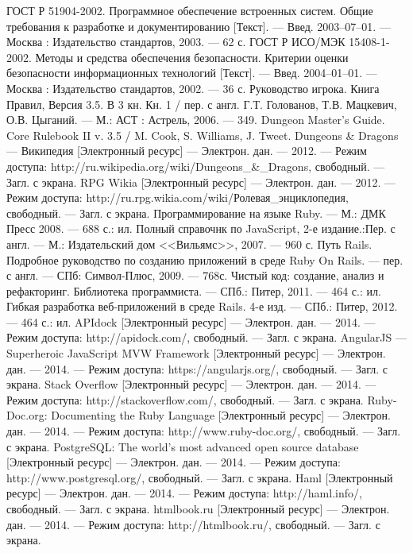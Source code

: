 \begin{thebibliography}{@@@@}
   ГОСТ Р 51904-2002. Программное обеспечение встроенных систем. Общие требования к разработке и документированию [Текст]. --- Введ. 2003–07–01. --- Москва : Издательство стандартов, 2003. --- 62 с. 
   ГОСТ Р ИСО/МЭК 15408-1-2002. Методы и средства обеспечения безопасности. Критерии оценки безопасности информационных технологий [Текст]. --- Введ. 2004–01–01. --- Москва : Издательство стандартов, 2002. --- 36 с.
   Руководство игрока. Книга Правил, Версия 3.5. В 3 кн. Кн. 1 / пер. с англ. Г.Т. Голованов, Т.В. Мацкевич, О.В. Цыганий. — М.: АСТ : Астрель, 2006. — 349.
   Dungeon Master's Guide. Core Rulebook II v. 3.5 / M. Cook, S. Williams, J. Tweet.
   Dungeons \& Dragons — Википедия [Электронный ресурс] --- Электрон. дан. --- 2012. --- Режим доступа: http://ru.wikipedia.org/wiki/Dungeons\_\&\_Dragons, свободный. --- Загл. с экрана.
   RPG Wikia [Электронный ресурс] --- Электрон. дан. --- 2012. --- Режим доступа: http://ru.rpg.wikia.com/wiki/Ролевая\_энциклопедия, свободный. --- Загл. с экрана.
   Программирование на языке Ruby. --- М.: ДМК Пресс 2008. --- 688 с.: ил.
   Полный справочнк по JavaScript, 2-е издание.:Пер. с англ. --- М.: Издательский дом <<Вильямс>>, 2007. --- 960 с.
   Путь Rails. Подробное руководство по созданию приложений в среде Ruby On Rails. --- пер. с англ. --- СПб: Символ-Плюс, 2009. --- 768с.
   Чистый код: создание, анализ и рефакторинг. Библиотека программиста. --- СПб.: Питер, 2011. --- 464 с.: ил.
   Гибкая разработка веб-приложений в среде Rails. 4-е изд. --- СПб.: Питер, 2012. --- 464 с.: ил.
   APIdock [Электронный ресурс] --- Электрон. дан. --- 2014. --- Режим доступа: http://apidock.com/, свободный. --- Загл. с экрана.
   AngularJS --- Superheroic JavaScript MVW Framework [Электронный ресурс] --- Электрон. дан. --- 2014. --- Режим доступа: https://angularjs.org/, свободный. --- Загл. с экрана.
   Stack Overflow [Электронный ресурс] --- Электрон. дан. --- 2014. --- Режим доступа: http://stackoverflow.com/, свободный. --- Загл. с экрана.
   Ruby-Doc.org: Documenting the Ruby Language [Электронный ресурс] --- Электрон. дан. --- 2014. --- Режим доступа: http://www.ruby-doc.org/, свободный. --- Загл. с экрана.
   PostgreSQL: The world's most advanced open source database [Электронный ресурс] --- Электрон. дан. --- 2014. --- Режим доступа: http://www.postgresql.org/, свободный. --- Загл. с экрана.
   Haml [Электронный ресурс] --- Электрон. дан. --- 2014. --- Режим доступа: http://haml.info/, свободный. --- Загл. с экрана.
   htmlbook.ru [Электронный ресурс] --- Электрон. дан. --- 2014. --- Режим доступа: http://htmlbook.ru/, свободный. --- Загл. с экрана.
\end{thebibliography}
